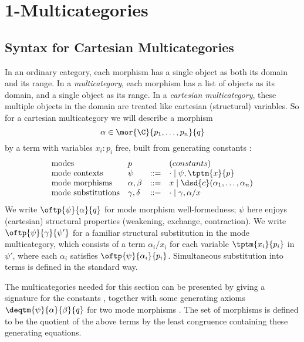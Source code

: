 
\section{1-Multicategories}

\subsection{Syntax for Cartesian Multicategories}
In an ordinary category, each morphism has a single object as both its
domain and its range.  In a \emph{multicategory}, each morphism has a
list of objects as its domain, and a single object as its range.  In a
\emph{cartesian multicategory}, these multiple objects in the domain are
treated like cartesian (structural) variables. So for a cartesian
multicategory \C\/ we will describe a morphism
\[
\alpha \in \mor{\C}{p_1,\ldots,p_n}{q}
\]
by a term with variables $x_i:p_i$ free, built from generating constants
:
\[
\begin{array}{llll}
\text{modes} & p & & (constants) \\
\text{mode contexts} & \psi & ::= & \cdot \mid \psi,\tptm{x}{p} \\
\text{mode morphisms} & \alpha,\beta & ::= & x \mid \dsd{c}(\alpha_1,\ldots,\alpha_n) \\
\text{mode substitutions} & \gamma,\delta & ::= & \cdot \mid \gamma,\alpha/x\\
\end{array}
\]
We write $\oftp{\psi}{\alpha}{q}$ for mode morphism well-formedness;
$\psi$ here enjoys (cartesian) structural properties (weakening,
exchange, contraction).  We write $\oftp{\psi}{\gamma}{\psi'}$ for a
familiar structural substitution in the mode multicategory, which
consists of a term $\alpha_i/x_i$ for each variable $\tptm{x_i}{p_i}$ in
$\psi'$, where each $\alpha_i$ satisfies $\oftp{\psi}{\alpha_i}{p_i}$.
Simultaneous substitution into terms is defined in the standard way.

The multicategories needed for this section can be presented by giving a
signature for the constants , together with some generating
axioms $\deqtm{\psi}{\alpha}{\beta}{q}$ for two mode morphisms
.  The set of morphisms is defined to be the
quotient of the above terms by the least congruence containing these
generating equations.

